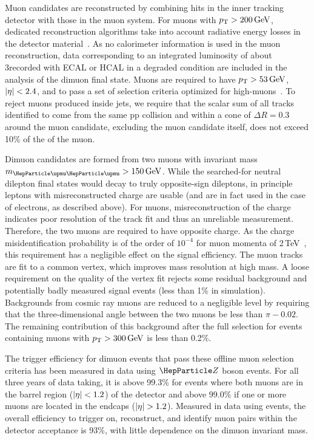\documentclass[11pt,twoside,a4paper,cmspaper,final,collab]{cms-tdr}
\begin{document}
Muon candidates are reconstructed by combining hits in the inner tracking detector with those in the muon system. For muons with $p_{\mathrm{T}} > 200\,\text{Ge\hspace{-.08em}V}$, dedicated reconstruction algorithms take into account radiative energy losses in the detector material~\cite{MUO-10-004-PAS,Sirunyan:2019yvv}. As no calorimeter information is used in the muon reconstruction, data corresponding to an integrated luminosity of about 3\fbinv recorded with ECAL or HCAL in a degraded condition are included in the analysis of the dimuon final state. Muons are required to have $p_{\mathrm{T}} > 53\,\text{Ge\hspace{-.08em}V}$, $\lvert \eta \rvert < 2.4$, and to pass a set of selection criteria optimized for high-\pt muons~\cite{Khachatryan:2014fba}. To reject muons produced inside jets, we require that the scalar \pt sum of all tracks identified to come from the same pp collision and within a cone of $\Delta R = 0.3$ around the muon candidate, excluding the muon candidate itself, does not exceed 10\% of the \pt of the muon. 

Dimuon candidates are formed from two muons with invariant mass $\muu >150\GeV$. While the searched-for neutral dilepton final states would decay to truly opposite-sign dileptons, in principle leptons with misreconstructed charge are usable (and are in fact used in the case of electrons, as described above). For muons, misreconstruction of the charge indicates poor resolution of the track fit and thus an unreliable \pt measurement. Therefore, the two muons are required to have opposite charge. As the charge misidentification probability is of the order of $10^{-4} $ for muon momenta of 2\,TeV~\cite{Sirunyan:2019yvv}, this requirement has a negligible effect on the signal efficiency. The muon tracks are fit to a common vertex, which improves mass resolution at high mass.  A loose requirement on the quality of the vertex fit rejects some residual background and potentially badly measured signal events (less than 1\% in simulation). Backgrounds from cosmic ray muons are reduced to a negligible level by requiring that the three-dimensional  angle between the two muons be less than $\pi - 0.02$. The remaining contribution of this background after the full selection for events containing muons with $p_{\mathrm{T}} > 300\,\text{Ge\hspace{-.08em}V}$ is less than 0.2\%.

The trigger efficiency for dimuon events that pass these offline muon selection criteria has been measured in data using $\PZ$ boson events. For all three years of data taking,  it is above 99.3\% for events where both muons are in the barrel region ($\lvert \eta \rvert < 1.2$) of the detector and above 99.0\% if one or more muons are located in the endcaps ($\lvert \eta \rvert>1.2$).
Measured in data using \PZ events,
the overall efficiency to trigger on, reconstruct, and identify muon pairs within the detector acceptance is 93\%, with little dependence on the dimuon invariant mass.
\end{document}
